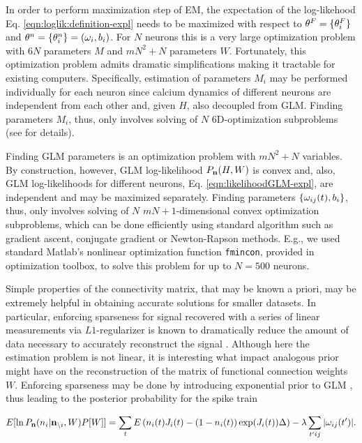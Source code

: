 In order to perform maximization step of EM, the expectation of the log-likehood  Eq. \eqref{eqn:loglik:definition-expl} needs to be maximized with respect to $\mathbf{\theta}^F=\{\mathbf{\theta}^F_i\}$ and $\mathbf{\theta}^n = \{\mathbf{\theta}^n_i\} = (\mathbf{\omega}_i, b_i)$. For $N$ neurons this is a very large optimization problem with $6N$ parameters $M$ and $m N^2 + N$ parameters $W$.  Fortunately, this optimization problem admits dramatic simplifications making it tractable for existing computers.  Specifically, estimation of parameters $M_i$ may be performed individually for each neuron since calcium dynamics of different neurons are independent from each other and, given $H$, also decoupled from GLM. Finding parameters $M_i$, thus, only involves solving of $N$ 6D-optimization subproblems (see \cite{Vogelstein2009} for details).

Finding GLM parameters is an optimization problem with $mN^2+N$ variables. By construction, however, GLM log-likelihood $P_{{\bf n}}(H, W)$ is convex and, also, GLM log-likelihoods for different neurons, Eq. \eqref{eqn:likelihoodGLM-expl}, are independent and may be maximized separately. Finding parameters $\{\omega_{ij}(t), b_i\}$, thus, only involves solving of $N$ $mN+1$-dimensional convex optimization subproblems, which can be done efficiently using standard algorithm such as gradient ascent, conjugate gradient or Newton-Rapson methods. E.g., we used standard Matlab's nonlinear optimization function \texttt{fmincon}, provided in optimization toolbox, to solve this problem for up to $N=500$ neurons.

Simple properties of the connectivity matrix, that may be known a priori, may be extremely helpful in obtaining accurate solutions for smaller datasets. In particular, enforcing sparseness for signal recovered with a series of linear measurements via $L1$-regularizer is known to dramatically reduce the amount of data necessary to accurately reconstruct the signal \cite{Candes2005, DE03, Mishchenko2009}. Although here the estimation problem is not linear, it is interesting what impact analogous prior might have on the reconstruction of the matrix of functional connection weights $W$. Enforcing sparseness may be done by introducing exponential prior to GLM \cite{Stevenson2009}, thus leading to the posterior probability for the spike train

\begin{equation}\label{eqn:likelihoodsparseGLM}
E[\ln P_{{\bf n}}(n_i|{\bf n}_{\backslash i}, W)P[W]]=\sum_t E\left( n_i(t) J_i(t) - (1-n_i(t)) \exp(J_i(t)) \Delta \right)-\lambda \sum_{t'ij}|\omega_{ij}(t')|.
\end{equation}


